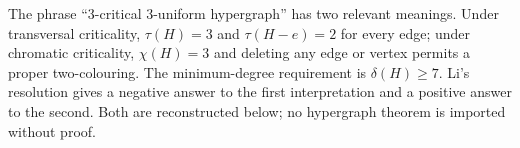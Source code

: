 The phrase ``3-critical 3-uniform hypergraph'' has two relevant meanings. Under transversal criticality, $\tau(H)=3$ and $\tau(H-e)=2$ for every edge; under chromatic criticality, $\chi(H)=3$ and deleting any edge or vertex permits a proper two-colouring. The minimum-degree requirement is $\delta(H)\ge7$. Li's resolution gives a negative answer to the first interpretation and a positive answer to the second. Both are reconstructed below; no hypergraph theorem is imported without proof.
